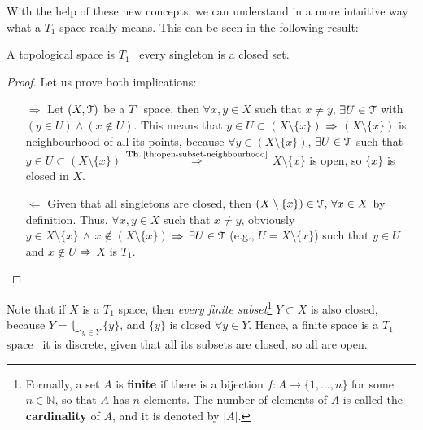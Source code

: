 With the help of these new concepts, we can understand in a more intuitive way what a $T_1$ space really means.
This can be seen in the following result:

\begin{theorem}
	\label{th:t1-closed-points}
	A topological space is $T_1$ \iff\ every singleton is a closed set.
\end{theorem}
\begin{proof}
	Let us prove both implications:
	\begin{itemize}
			\item[$\boxed{\Rightarrow}$] Let $(X,\EuScript{T})$ be a $T_1$ space, then $\forall x,y \in X$ such that $x\neq y$, $\exists U\in\EuScript{T}$ with $(y\in U)\land (x\notin U)$. This means that $y\in U\subset (X\setminus\{x\})$ $\Rightarrow$ $(X\setminus\{x\})$ is neighbourhood of all its points, because $\forall y\in (X\setminus\{x\})$, $\exists U\in \EuScript{T}$ such that $y\in U\subset (X\setminus\{x\})$ $\overset{\text{\thref{th:open-subset-neighbourhood}}}{\Then}$ $X\setminus\{x\}$ is open, so $\{x\}$ is closed in $X$.
		\item[$\boxed{\Leftarrow}$] Given that all singletons are closed,  then $(X\setminus\{x\})\in \EuScript{T},\,\forall x\in X$ by definition. Thus, $\forall x,y\in X$ such that $x\neq y$, obviously $y\in X\setminus\{x\}\,\land\,x\notin (X\setminus\{x\})$ $\Rightarrow$ $\exists U\in \EuScript{T}$ (e.g., $U=X\setminus\{x\}$) such that $y\in U$ and $x\notin U$ $\Rightarrow$ $X$ is $T_1$.
	\end{itemize}
\end{proof}

\begin{remark}
	Note that if $X$ is a $T_1$ space, then \emph{every finite subset}\footnote{Formally, a set $A$ is \textbf{finite} if there is a bijection $f:A\rightarrow\{1,\dots,n\}$ for some $n\in \mathbb{N}$, so that $A$ has $n$ elements. The number of elements of $A$ is called the \textbf{cardinality} of $A$, and it is denoted by $|A|$.} $Y\subset X$ is also closed, because $Y=\bigcup_{y\in Y}\{y\}$, and $\{y\}$ is closed $\forall y\in Y$.
	Hence, a finite space is a $T_1$ space \iff\ it is discrete, given that all its subsets are closed, so all are open.
\end{remark}

